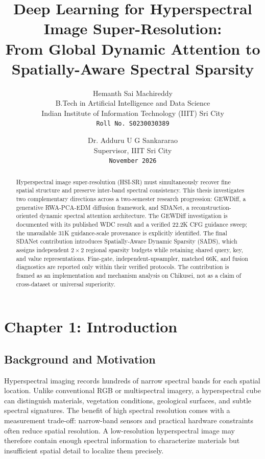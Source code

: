 \documentclass[10pt,twocolumn,letterpaper]{article}
\title{Deep Learning for Hyperspectral Image Super-Resolution:\\From Global Dynamic Attention to Spatially-Aware Spectral Sparsity}
\author{Hemanth Sai Machireddy\\
B.Tech in Artificial Intelligence and Data Science\\
Indian Institute of Information Technology (IIIT) Sri City\\
{\tt\small Roll No. S0230030389}
\and
Dr. Adduru U G Sankararao\\
Supervisor, IIIT Sri City\\
{\tt\small November 2026}}
\begin{document}
\maketitle

\clearpage
\onecolumn
\tableofcontents
\listoffigures
\listoftables
\clearpage
\twocolumn

\begin{abstract}
Hyperspectral image super-resolution (HSI-SR) must simultaneously recover fine spatial structure and preserve inter-band spectral consistency. This thesis investigates two complementary directions across a two-semester research progression: GEWDiff, a generative RWA-PCA-EDM diffusion framework, and SDANet, a reconstruction-oriented dynamic spectral attention architecture. The GEWDiff investigation is documented with its published WDC result and a verified 22.2K CFG guidance sweep; the unavailable 31K guidance-scale provenance is explicitly identified. The final SDANet contribution introduces Spatially-Aware Dynamic Sparsity (SADS), which assigns independent $2\times2$ regional sparsity budgets while retaining shared query, key, and value representations. Fine-gate, independent-upsampler, matched 66K, and fusion diagnostics are reported only within their verified protocols. The contribution is framed as an implementation and mechanism analysis on Chikusei, not as a claim of cross-dataset or universal superiority.
\end{abstract}

\section{Chapter 1: Introduction}
\label{sec:introduction}

\subsection{Background and Motivation}

Hyperspectral imaging records hundreds of narrow spectral bands for each spatial location. Unlike conventional RGB or multispectral imagery, a hyperspectral cube can distinguish materials, vegetation conditions, geological surfaces, and subtle spectral signatures. The benefit of high spectral resolution comes with a measurement trade-off: narrow-band sensors and practical hardware constraints often reduce spatial resolution. A low-resolution hyperspectral image may therefore contain enough spectral information to characterize materials but insufficient spatial detail to localize them precisely.
\end{document}
